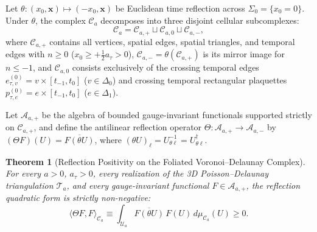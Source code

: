 \documentclass[11pt, a4paper]{article}
\newtheorem{theorem}{Theorem}[section]
\theoremstyle{definition}
\theoremstyle{remark}
\begin{document}
Let $\theta: (x_{0}, \mathbf{x}) \mapsto (-x_{0}, \mathbf{x})$ be Euclidean time reflection across $\Sigma_{0} = \{x_{0} = 0\}$. Under $\theta$, the complex $\mathcal{C}_{a}$ decomposes into three disjoint cellular subcomplexes:
\begin{equation}
  \mathcal{C}_{a} = \mathcal{C}_{a,+} \sqcup \mathcal{C}_{a,0} \sqcup \mathcal{C}_{a,-},
\end{equation}
where $\mathcal{C}_{a,+}$ contains all vertices, spatial edges, spatial triangles, and temporal edges with $n \ge 0$ ($x_{0} \ge +\frac{1}{2}a_{\tau} > 0$), $\mathcal{C}_{a,-} = \theta(\mathcal{C}_{a,+})$ is its mirror image for $n \le -1$, and $\mathcal{C}_{a,0}$ consists exclusively of the crossing temporal edges $e_{\tau, v}^{(0)} = v \times [t_{-1}, t_{0}]$ ($v \in \Delta_{0}$) and crossing temporal rectangular plaquettes $p_{\tau, e}^{(0)} = e \times [t_{-1}, t_{0}]$ ($e \in \Delta_{1}$).

Let $\mathcal{A}_{a,+}$ be the algebra of bounded gauge-invariant functionals supported strictly on $\mathcal{C}_{a,+}$, and define the antilinear reflection operator $\Theta: \mathcal{A}_{a,+} \to \mathcal{A}_{a,-}$ by $(\Theta F)(U) = \overline{F(\theta U)}$, where $(\theta U)_{\ell} = U_{\theta\ell}^{-1} = U_{\theta\ell}^{\dagger}$.

\begin{theorem}[Reflection Positivity on the Foliated Voronoi--Delaunay Complex]
\label{thm:os2}
For every $a > 0$, $a_{\tau} > 0$, every realization of the 3D Poisson--Delaunay triangulation $\mathcal{T}_{a}$, and every gauge-invariant functional $F \in \mathcal{A}_{a,+}$, the reflection quadratic form is strictly non-negative:
\begin{equation}
  \langle \Theta F, F \rangle_{\mathcal{C}_{a}} \equiv \int_{\mathcal{U}_{a}} \overline{F(\theta U)}\,F(U)\,d\mu_{\mathcal{C}_{a}}(U) \ge 0.
\end{equation}
\end{theorem}
\end{document}
